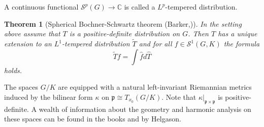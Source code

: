 \documentclass[12pt,reqno,a4paper]{amsart}
\theoremstyle{theorem}
\newtheorem{theorem}{Theorem}[section]
\theoremstyle{definition}
\numberwithin{theorem}{section}
\numberwithin{equation}{section}
\newcommand{\C}{\mathbb{C}}
\begin{document}
A continuous functional $\mathscr{S}^p(G)\to \C$ is called a $L^p$-tempered distribution.
\begin{theorem}[Spherical Bochner-Schwartz theorem (Barker,\cite{Barker})]\label{t:noncompact_ss_bochner_schwartz}
	In the setting above assume that $T$ is a positive-definite distribution on $G$. Then $T$ has a unique extension to an $L^1$-tempered distribution $\tilde{T}$ and for all $f\in \mathscr{S}^1(G, K)$ the formula
	\[\tilde{T}f = \int \widehat{f}d\widehat{T}\]
	holds.
\end{theorem}

The spaces $G/K$ are equipped with a natural left-invariant Riemannian metrics induced by the bilinear form $\kappa$ on $\mathfrak p \cong T_{x_0}(G/K)$. Note that $\kappa|_{\mathfrak{p}\times \mathfrak{p}}$ is positive-definite. A wealth of information about the geometry and harmonic analysis on these spaces can be found in the books \cite{Helgason} and \cite{Helgason2} by Helgason.
\end{document}
